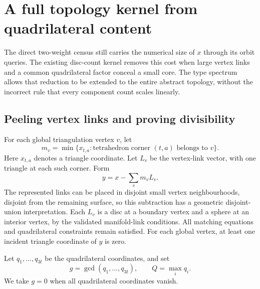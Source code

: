 \section{A full topology kernel from quadrilateral content}
\label{sec:kernel}

The direct two-weight census still carries the numerical size of $x$ through
its orbit queries. The existing disc-count kernel removes this cost when
large vertex links and a common quadrilateral factor conceal a small core.
The type spectrum allows that reduction to be extended to the entire
abstract topology, without the incorrect rule that every component count
scales linearly.

\subsection{Peeling vertex links and proving divisibility}

For each global triangulation vertex $v$, let
\[
 m_v=\min\{x_{t,a}:\text{tetrahedron corner }(t,a)\text{ belongs to }v\}.
\]
Here $x_{t,a}$ denotes a triangle coordinate. Let $L_v$ be the vertex-link
vector, with one triangle at each such corner. Form
\[
 y=x-\sum_v m_v L_v.
\]
The represented links can be placed in disjoint small vertex neighbourhoods,
disjoint from the remaining surface, so this subtraction has a geometric
disjoint-union interpretation. Each $L_v$ is a disc at a boundary vertex and
a sphere at an interior vertex, by the validated manifold-link conditions.
All matching equations and quadrilateral constraints remain satisfied.
For each global vertex, at least one incident triangle coordinate of $y$
is zero.

Let $q_1,\ldots,q_{3t}$ be the quadrilateral coordinates, and set
\[
 g=\gcd(q_1,\ldots,q_{3t}),\qquad Q=\max_i q_i.
\]
We take $g=0$ when all quadrilateral coordinates vanish.

